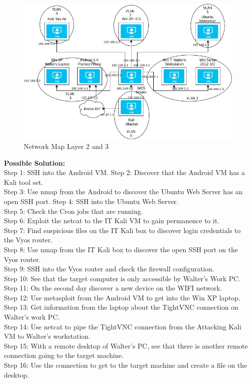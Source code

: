 \documentclass[12pt]{extarticle}
\begin{document}
\begin{figure}[H]
	\includegraphics[width=\linewidth]{NetworkMap2_3.jpg}
    \caption{Network Map Layer 2 and 3}
    \label{fig:NetworkMap2}
\end{figure}
\noindent\textbf{Possible Solution:}\\
Step 1: SSH into the Android VM.
Step 2: Discover that the Android VM has a Kali tool set.\\
Step 3: Use nmap from the Android to discover the Ubuntu Web Server has an open SSH port.
Step 4: SSH into the Ubuntu Web Server.\\
Step 5: Check the Cron jobs that are running.\\
Step 6: Exploit the netcat to the IT Kali VM to gain permanence to it.\\
Step 7: Find suspicious files on the IT Kali box to discover login credentials to the Vyos router.\\
Step 8: Use nmap from the IT Kali box to discover the open SSH port on the Vyos router.\\
Step 9: SSH into the Vyos router and check the firewall configuration.\\
Step 10: See that the target computer is only accessible by Walter's Work PC.\\
Step 11: On the second day discover a new device on the WIFI network.\\
Step 12: Use metasploit from the Android VM to get into the Win XP laptop.\\
Step 13: Get information from the laptop about the TightVNC connection on Walter's work PC.\\
Step 14: Use netcat to pipe the TightVNC connection from the Attacking Kali VM to Walter's workstation.\\ 
Step 15: With a remote desktop of Walter's PC, see that there is another remote connection going to the target machine.\\
Step 16: Use the connection to get to the target machine and create a file on the desktop.
\end{document}
